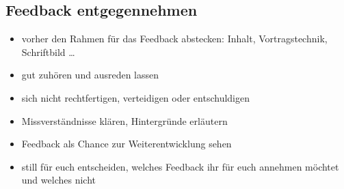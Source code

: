 \subsection{Feedback entgegennehmen}
\begin{itemize}
    \item vorher den Rahmen für das Feedback abstecken: Inhalt, Vortragstechnik, Schriftbild \ldots
    \item gut zuhören und ausreden lassen
    \item sich nicht rechtfertigen, verteidigen oder entschuldigen
    \item Missverständnisse klären, Hintergründe erläutern
    \item Feedback als Chance zur Weiterentwicklung sehen
    \item still für euch entscheiden, welches Feedback ihr für euch annehmen möchtet und welches nicht
\end{itemize}
